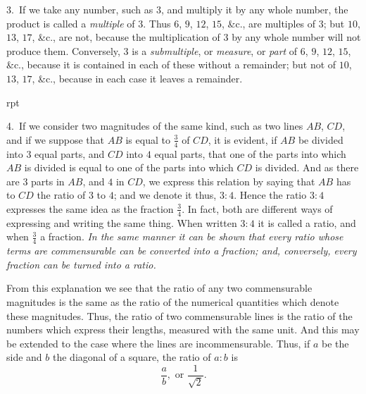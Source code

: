 \documentclass[oneside]{book}
\newcommand\imgflow[3]{
\setcounter{wrapwidth}{#1}
\begin{wrapfigure}[#2]{r}{\value{wrapwidth}pt}
\begin{center}
\vspace{-0.3in}
\end{center}
\end{wrapfigure}
}
\begin{document}
\begin{footnotesize}
3.~If we take any number, such as $3$, and multiply it by any
whole number, the product is called a \emph{multiple} of $3$. Thus $6$, $9$,
$12$, $15$, \&c., are multiples of $3$; but $10$, $13$, $17$, \&c., are not, because
the multiplication of $3$ by any whole number will not produce
them. Conversely, $3$ is a \emph{submultiple}, or \emph{measure}, or \emph{part}
of $6$, $9$, $12$, $15$, \&c., because it is contained in each of these without
a remainder; but not of $10$, $13$, $17$, \&c., because in each case
it leaves a remainder.

\imgflow{150}{6}{f257}

4.~If we consider two magnitudes of the same kind, such as
two lines $AB$, $CD$, and if we suppose that $AB$ is equal to $\frac{3}{4}$ of
$CD$, it is evident, if $AB$ be divided into $3$ equal parts, and $CD$ into
$4$ equal parts, that one of the
parts into which $AB$ is divided
is equal to one of the parts into
which $CD$ is divided. And as
there are $3$ parts in $AB$, and $4$
in $CD$, we express this relation
by saying that $AB$ has to
$CD$ the ratio of $3$ to $4$; and we denote it thus, $3:4$. Hence the
ratio $3:4$ expresses the same idea as the fraction $\frac{3}{4}$. In fact,
both are different ways of expressing and writing the same thing.
When written $3:4$ it is called a ratio, and when $\frac{3}{4}$ a fraction.
\emph{In the same manner it can be shown that every ratio whose terms
are commensurable can be converted into a fraction; and, conversely,
every fraction can be turned into a ratio.}\par\smallskip

From this explanation we see that the ratio of any two commensurable
magnitudes is the same as the ratio of the numerical
quantities which denote these magnitudes. Thus, the ratio of
two commensurable lines is the ratio of the numbers which express
their lengths, measured with the same unit. And this may
be extended to the case where the lines are incommensurable.
Thus, if $a$ be the side and $b$ the diagonal of a square, the ratio
of $a:b$ is
\[
\frac{a}{b}, \text{\ or } \frac{1}{\sqrt{2}}.
\]


\end{footnotesize}
\end{document}
